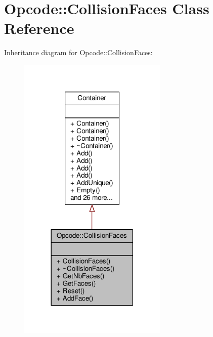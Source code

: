 \hypertarget{classOpcode_1_1CollisionFaces}{}\section{Opcode\+:\+:Collision\+Faces Class Reference}
\label{classOpcode_1_1CollisionFaces}


Inheritance diagram for Opcode\+:\+:Collision\+Faces\+:
\nopagebreak
\begin{figure}[H]
\begin{center}
\leavevmode
\includegraphics[width=201pt]{d9/d60/classOpcode_1_1CollisionFaces__inherit__graph}
\end{center}
\end{figure}


